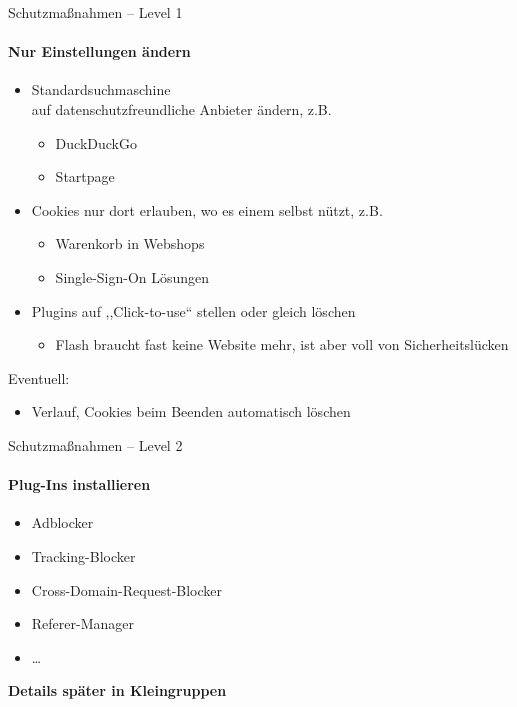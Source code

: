 \begin{frame}{Schutzmaßnahmen -- Level 1}
\framesubtitle{Nur Einstellungen ändern}
  \begin{itemize}
    \item Standardsuchmaschine\\ auf datenschutzfreundliche Anbieter ändern, z.B.
    \begin{itemize}
      \item DuckDuckGo
      \item Startpage
    \end{itemize}
    \item Cookies nur dort erlauben, wo es einem selbst nützt, z.B.
    \begin{itemize}
      \item Warenkorb in Webshops
      \item Single-Sign-On Lösungen
    \end{itemize}
    \item Plugins auf ,,Click-to-use`` stellen oder gleich löschen
    \begin{itemize}
      \item Flash braucht fast keine Website mehr, ist aber voll von Sicherheitslücken
    \end{itemize}
  \end{itemize}

  Eventuell:
  \begin{itemize}
    \item Verlauf, Cookies beim Beenden automatisch löschen
  \end{itemize}
\end{frame}

\begin{frame}{Schutzmaßnahmen -- Level 2}
\framesubtitle{Plug-Ins installieren}
  \begin{itemize}
    \item Adblocker
    \item Tracking-Blocker
    \item Cross-Domain-Request-Blocker
    \item Referer-Manager
    \item \ldots
  \end{itemize}
  \pause
  \textbf{Details später in Kleingruppen}
\end{frame}

